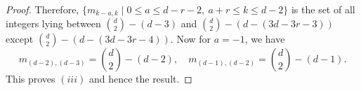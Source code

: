 \documentclass[10pt,a4paper]{amsart}
\begin{document}
\begin{proof}
Therefore, ${\{m_{k-a,k} \mid 0\leq a \leq d-r-2,\ a+r \leq k \leq d-2\}}$ is the set of all integers lying between $\binom{d}{2}-(d-3)$ and 
 $\binom{d}{2}-(d-(3d-3r-3))$ except $\binom{d}{2}-(d-(3d-3r-4))$.
 Now for $a=-1$, we have
 $$m_{(d-2),(d-3)}=\binom{d}{2}-(d-2),\quad m_{(d-1),(d-2)}=\binom{d}{2}-(d-1).$$ 
This proves $(iii)$ and hence the result.
\end{proof} 
\end{document}
